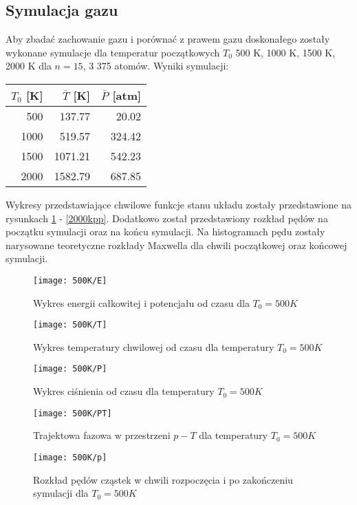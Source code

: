\documentclass[a4paper,10pt]{article}
\begin{document}
	\clearpage
	\subsection{Symulacja gazu}
	Aby zbadać zachowanie gazu i porównać z prawem gazu doskonałego zostały wykonane symulacje dla temperatur początkowych $T_0$ 500 K, 1000 K, 1500 K, 2000 K dla $n = 15$, 3 375 atomów. Wyniki symulacji:
	\begin{center}
	\begin{tabular}{r|r|r}
		$T_0$ [K] & $\bar{T}$ [K] & $\bar{P}$ [atm]\\
		\hline
		\hline
		500 & 137.77 & 20.02 \\
		1000 & 519.57 & 324.42 \\
		1500 & 1071.21 & 542.23 \\
	 	2000 & 1582.79 & 687.85
	\end{tabular} 
	\end{center}
	Wykresy przedstawiające chwilowe funkcje stanu układu zostały przedstawione na rysunkach \ref{500ke} - \ref{2000kpp}. Dodatkowo został przedstawiony rozkład pędów na początku symulacji oraz na końcu symulacji. Na histogramach pędu zostały narysowane teoretyczne rozkłady Maxwella dla chwili początkowej oraz końcowej symulacji.
	    \begin{figure}[h]
		    \centering
		    \texttt{[image: 500K/E]}
		    \caption{Wykres energii całkowitej i potencjału od czasu dla $T_0 = 500 K$}
		    \label{500ke}
	    \end{figure}
	    \begin{figure}[h]
		    \centering
		    \texttt{[image: 500K/T]}
		    \caption{Wykres temperatury chwilowej od czasu dla temperatury $T_0 = 500 K$}
		    \label{500kt}
	    \end{figure}
	    \begin{figure}[h]
		    \centering
		    \texttt{[image: 500K/P]}
		    \caption{Wykres ciśnienia od czasu dla temperatury $T_0 = 500 K$}
		    \label{500kp}
	    \end{figure}
	    \begin{figure}[h]
		    \centering
		    \texttt{[image: 500K/PT]}
		    \caption{Trajektowa fazowa w przestrzeni $p-T$ dla temperatury $T_0 = 500 K$}
		    \label{500kpt}
	    \end{figure}
	    \begin{figure}[h]
		    \centering
		    \texttt{[image: 500K/p]}
		    \caption{Rozkład pędów cząstek w chwili rozpoczęcia i po zakończeniu symulacji dla $T_0 = 500 K$}
		    \label{500kpp}
	    \end{figure}	    
		
\end{document}
